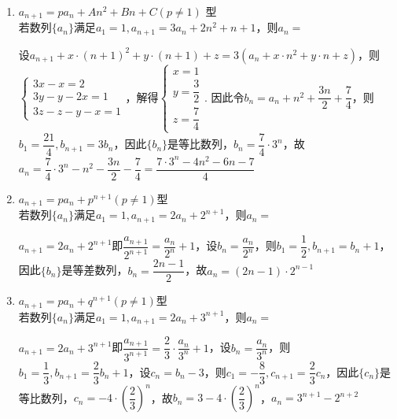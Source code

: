 \begin{enumerate}
\begin{enumerate}
\begin{jieda}
            \end{jieda}
        \item $a_{n+1} = pa_n + An^2+Bn+C (p \neq 1)$ 型 \\
        若数列$\{a_n\}$满足$a_1 = 1, a_{n+1} = 3a_n + 2n^2 + n + 1$，则$a_n = $
        \begin{jieda}
            设$a_{n+1} + x \cdot (n+1)^2 + y \cdot (n+1) + z = 3(a_n + x \cdot n^2 + y \cdot n + z)$，则$\left \{ \begin{array}{l}
                 3x - x = 2  \\
                 3y - y - 2x = 1  \\
                 3z - z - y - x = 1
            \end{array} \right.$，解得$\left \{ \begin{array}{l}
                 x = 1  \\
                 y = \dfrac{3}{2}  \\
                 z = \dfrac{7}{4}
            \end{array} \right.$. 因此令$b_n = a_n + n^2 + \dfrac{3n}{2} + \dfrac{7}{4}$，则$b_1 = \dfrac{21}{4}, b_{n+1} = 3b_n$，因此$\{b_n\}$是等比数列，$b_n = \dfrac{7}{4} \cdot 3^n$，故$a_n = \dfrac{7}{4} \cdot 3^n - n^2 - \dfrac{3n}{2} - \dfrac{7}{4} = \dfrac{7 \cdot 3^n - 4n^2 - 6n - 7}{4}$
        \end{jieda}
        \item $a_{n+1} = pa_n + p^{n+1} (p \neq 1)$型 \\
        若数列$\{a_n\}$满足$a_1 = 1, a_{n+1} = 2a_n + 2^{n+1}$，则$a_n = $
        \begin{jieda}
            $a_{n+1} = 2a_n + 2^{n+1}$即$\dfrac{a_{n+1}}{2^{n+1}} = \dfrac{a_n}{2^n} + 1$，设$b_n = \dfrac{a_n}{2^n}$，则$b_1 = \dfrac{1}{2}, b_{n+1} = b_n + 1$，因此$\{b_n\}$是等差数列，$b_n = \dfrac{2n-1}{2}$，故$a_n = (2n-1)\cdot 2^{n-1}$
        \end{jieda}
        \item $a_{n+1} = pa_n + q^{n+1} (p \neq 1)$型 \\
        若数列$\{a_n\}$满足$a_1 = 1, a_{n+1} = 2a_n + 3^{n+1}$，则$a_n = $
        \begin{jieda}
            $a_{n+1} = 2a_n + 3^{n+1}$即$\dfrac{a_{n+1}}{3^{n+1}} = \dfrac{2}{3} \cdot \dfrac{a_n}{3^n} + 1$，设$b_n = \dfrac{a_n}{3^n}$，则$b_1 = \dfrac{1}{3}, b_{n+1} = \dfrac{2}{3}b_n + 1$，设$c_n = b_n - 3$，则$c_1 = -\dfrac{8}{3}, c_{n+1} = \dfrac{2}{3}c_n$，因此$\{c_n\}$是等比数列，$c_n = -4 \cdot \left ( \dfrac{2}{3} \right )^n$，故$b_n = 3 - 4 \cdot \left ( \dfrac{2}{3} \right )^n$，$a_n = 3^{n+1} - 2^{n+2}$

\end{jieda}
\end{enumerate}
\end{enumerate}
